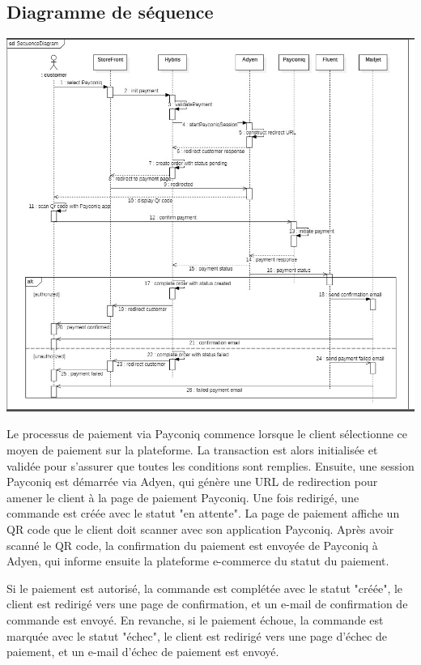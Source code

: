 \subsection{Diagramme de séquence}

\begin{center}
    \centering
    \includegraphics[width=19cm]{Figures/sequence.png}
    \label{fig:processus}
\end{center} 


Le processus de paiement via Payconiq commence lorsque le client sélectionne ce moyen de paiement sur la plateforme. La transaction est alors initialisée et validée pour s'assurer que toutes les conditions sont remplies. Ensuite, une session Payconiq est démarrée via Adyen, qui génère une URL de redirection pour amener le client à la page de paiement Payconiq. Une fois redirigé, une commande est créée avec le statut "en attente". La page de paiement affiche un QR code que le client doit scanner avec son application Payconiq. Après avoir scanné le QR code, la confirmation du paiement est envoyée de Payconiq à Adyen, qui informe ensuite la plateforme e-commerce du statut du paiement.

Si le paiement est autorisé, la commande est complétée avec le statut "créée", le client est redirigé vers une page de confirmation, et un e-mail de confirmation de commande est envoyé. En revanche, si le paiement échoue, la commande est marquée avec le statut "échec", le client est redirigé vers une page d'échec de paiement, et un e-mail d'échec de paiement est envoyé.



